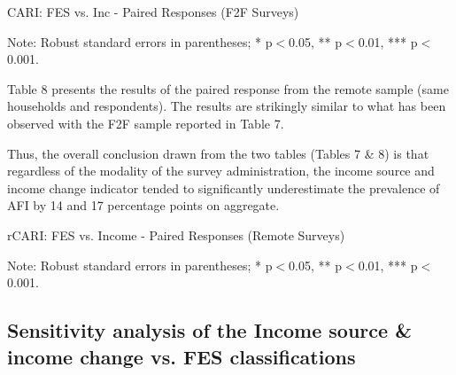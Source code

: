 \documentclass[11pt,harvard]{article}
\begin{document}
	\begin{table}[htbp]
	\centering
	\begin{adjustbox}{max width=\textwidth}
		\begin{threeparttable}
			\caption{CARI: FES vs. Inc - Paired Responses (F2F Surveys)}
			\scriptsize
			 
			\label{tab:BF_F2F_Paired_ttest_Full}
			\begin{tablenotes}
				\item Note: Robust standard errors in parentheses; * p$<$0.05, ** p$<$0.01, *** p$<$0.001.
			\end{tablenotes}
		\end{threeparttable}
	\end{adjustbox}
	\end{table}
	
	Table 8 presents the results of the paired response from the remote sample (same households and respondents). The results are strikingly similar to what has been observed with the F2F sample reported in Table 7. 
	
	Thus, the overall conclusion drawn from the two tables (Tables 7 \& 8) is that regardless of the modality of the survey administration, the income source and income change indicator tended to significantly underestimate the prevalence of AFI by 14 and 17 percentage points on aggregate.
	
	\begin{table}[htbp]
		\centering
		\begin{adjustbox}{max width=\textwidth}
			\begin{threeparttable}
				\caption{rCARI: FES vs. Income - Paired Responses (Remote Surveys)}
				\scriptsize
				 
				\label{tab:BF_RM_Paired_ttest_Full}
				\begin{tablenotes}
					\item Note: Robust standard errors in parentheses; * p$<$0.05, ** p$<$0.01, *** p$<$0.001.
				\end{tablenotes}
			\end{threeparttable}
		\end{adjustbox}
	\end{table}
	
	\subsection{Sensitivity analysis of the Income source \& income change vs. FES classifications}
	
\end{document}
